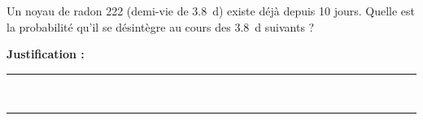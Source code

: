 Un noyau de radon 222 (demi-vie de \qty{3.8}{d}) existe déjà depuis \num{10} jours. Quelle est la probabilité qu'il se désintègre au cours des \qty{3.8}{d} suivants ?

\choices

\noindent\textbf{Justification :} \hrulefill \\[2.5ex]
\rule{\linewidth}{0.4pt} \\[2.5ex]
\rule{\linewidth}{0.4pt}
\vfill
